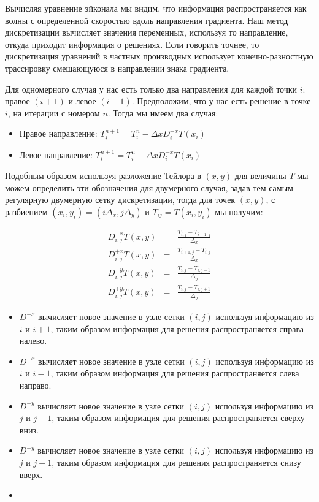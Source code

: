 Вычисляя уравнение эйконала мы видим, что информация распространяется
как волны с определенной скоростью вдоль направления градиента. Наш
метод дискретизации вычисляет значения переменных, используя то
направление, откуда приходит информация о решениях. Если говорить
точнее, то дискретизация уравнений в частных производных использует
конечно-разностную трассировку смещающуюся в направлении знака
градиента.

Для одномерного случая у нас есть только два направления для каждой
точки $i$: правое $(i+1)$ и левое $(i - 1)$. Предположим, что у нас
есть решение в точке $i$, на итерации с номером $n$. Тогда мы имеем
два случая:
\begin{itemize}
\item Правое направление: $T_i^{n+1} = T_i^n - \Delta x D^{+x}_iT(x_i)$
\item Левое направление: $T_i^{n+1} = T_i^n - \Delta x D^{-x}_iT(x_i)$
\end{itemize}


Подобным образом используя разложение Тейлора в $(x,y)$ для
величины $T$ мы можем определить эти обозначения для двумерного
случая, задав тем самым регулярную двумерную сетку дискретизации,
тогда для точек $(x,y)$, с разбиением
$(x_i,y_i) = (i\Delta_x,j \Delta_y)$ и $T_{ij} = T(x_i,y_i)$ мы
получим:

\begin{equation}
  \begin{aligned}
  \label{eq:discrete-defines}
    D^{-x}_{i,j}T(x,y)& =& \frac{T_{i,j} - T_{i-1,j}}{\Delta_x}  \\
    D^{+x}_{i,j}T(x,y)& =& \frac{T_{i+1,j} - T_{i,j}}{\Delta_x}  \\
    D^{-y}_{i,j}T(x,y) &=& \frac{T_{i,j} - T_{i,j-1}}{\Delta_y}  \\
    D^{+y}_{i,j}T(x,y) &=& \frac{T_{i,j} - T_{i,j+1}}{\Delta_y}
    \end{aligned}
\end{equation}

\begin{itemize}
\item $D^{+x}$ вычисляет новое значение в узле сетки $(i,j)$ используя
  информацию из $i$ и $i+1$, таким образом информация для решения
  распространяется справа налево.

\item $D^{-x}$ вычисляет новое значение в узле сетки $(i,j)$ используя
  информацию из $i$ и $i-1$, таким образом информация для решения
  распространяется слева направо.
\item $D^{+y}$ вычисляет новое значение в узле сетки $(i,j)$ используя
  информацию из $j$ и $j+1$, таким образом информация для решения
  распространяется сверху вниз.

\item $D^{-y}$ вычисляет новое значение в узле сетки $(i,j)$ используя
  информацию из $j$ и $j-1$, таким образом информация для решения
  распространяется снизу вверх.

\item 
\end{itemize}

